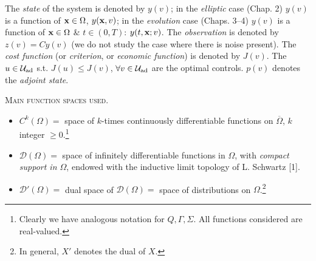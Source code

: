\documentclass[oneside]{book}
\numberwithin{equation}{section}
\begin{document}
The \textit{state} of the system is denoted by $y(v)$; in the \textit{elliptic} case (Chap. 2) $y(v)$ is a function of ${\bf x}\in\Omega$, $y({\bf x},v)$; in the \textit{evolution} case (Chaps. 3--4) $y(v)$ is a function of ${\bf x}\in\Omega$ \& $t\in(0,T)$: $y(t,{\bf x};v)$. The \textit{observation} is denoted by $z(v) = Cy(v)$ (we do not study the case where there is noise present). The \textit{cost function} (or \textit{criterion}, or \textit{economic function}) is denoted by $J(v)$. The $u\in\mathcal{U}_{\rm ad}$ s.t. $J(u)\le J(v)$, $\forall v\in\mathcal{U}_{\rm ad}$ are the optimal controls. $p(v)$ denotes the \textit{adjoint state}.

\textsc{Main function spaces used.}
\begin{itemize}
	\item $C^k(\Omega) =$ space of $k$-times continuously differentiable functions on $\overline{\Omega}$, $k$ integer $\ge 0$.\footnote{Clearly we have analogous notation for $Q,\Gamma,\Sigma$. All functions considered are real-valued.}
	\item $\mathcal{D}(\Omega) =$ space of infinitely differentiable functions in $\Omega$, with \textit{compact support in $\Omega$}, endowed with the inductive limit topology of L. Schwartz [1].
	\item $\mathcal{D}'(\Omega) =$ dual space of $\mathcal{D}(\Omega) =$ space of distributions on $\Omega$.\footnote{In general, $X'$ denotes the dual of $X$.}
	

\end{itemize}
\end{document}

